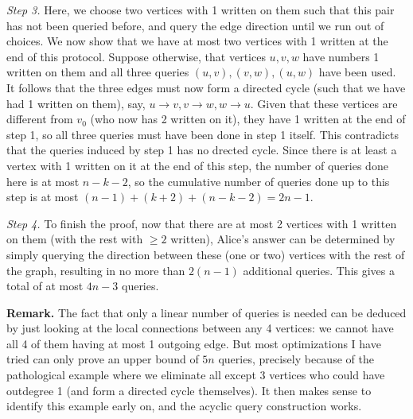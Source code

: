 \documentclass[11pt,a4paper]{article}
\begin{document}
\begin{enumerate}
	\emph{Step 3.} 
	Here, we choose two vertices with 1 written on them such that this pair has not been queried before, 
	and query the edge direction until we run out of choices. 
	We now show that we have at most two vertices with 1 written at the end of this protocol. 
	Suppose otherwise, that vertices $u, v, w$ have numbers 1 written on them and all three queries $(u, v), (v, w), (u, w)$ have been used. 
	It follows that the three edges must now form a directed cycle (such that we have had 1 written on them), 
	say, $u\to v, v\to w, w\to u$. 
	Given that these vertices are different from $v_0$ (who now has 2 written on it), 
	they have 1 written at the end of step 1, 
	so all three queries must have been done in step 1 itself. 
	This contradicts that the queries induced by step 1 has no drected cycle. 
	Since there is at least a vertex with 1 written on it at the end of this step, 
	the number of queries done here is at most $n - k - 2$, so the cumulative number of queries done up to this step is at most $(n - 1) + (k + 2) + (n - k - 2) = 2n - 1$. 
	
	\emph{Step 4.} To finish the proof, now that there are at most 2 vertices with 1 written on them (with the rest with $\ge 2$ written), 
	Alice's answer can be determined by simply querying the direction between these (one or two) vertices with the rest of the graph, 
	resulting in no more than $2(n - 1)$ additional queries. 
	This gives a total of at most $4n - 3$ queries. 
	
	\textbf{Remark.} 
	The fact that only a linear number of queries is needed can be deduced by just looking at the local connections between any 4 vertices: 
	we cannot have all 4 of them having at most 1 outgoing edge. But most optimizations I have tried can only prove an upper bound of $5n$ queries, 
	precisely because of the pathological example where we eliminate all except 3 vertices who could have outdegree 1 (and form a directed cycle themselves). 
	It then makes sense to identify this example early on, and the acyclic query construction works. 
\end{enumerate}
\end{document}
